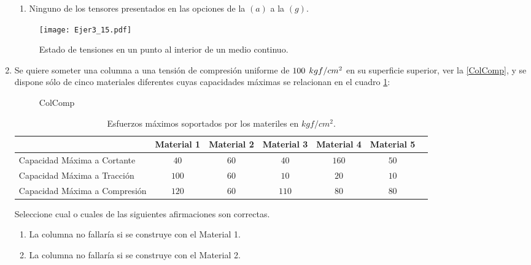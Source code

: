 \documentclass[../notas medios.tex]{subfiles}
\begin{document}
\begin{enumerate}
\begin{enumerate}
		\item Ninguno de los tensores presentados en las opciones de la $(a)$ a la $(g)$.
	\end{enumerate}
%
\begin{figure}[H]
	\centering
	\texttt{[image: Ejer3\_15.pdf]}
	\caption{Estado de tensiones en un punto al interior de un medio continuo.}
	\label{otro:esta}
\end{figure}
%
\item \label{punto16} Se quiere someter una columna a una tensi\'on de
compresi\'on uniforme de $100\hspace{.15cm} kgf/cm^2$ en su superficie superior, ver la  \cref{ColComp}, y se dispone s\'olo de cinco materiales diferentes cuyas capacidades m\'aximas se relacionan en el cuadro \cref{tab:materiales}:
%
\begin{figure}[H]
	\centering
		\hspace{2.0cm}
	\caption{ ColComp}
\end{figure}
%
\begin{table}[H]
\begin{center}
    \begin{tabular}{ | l | c | c | c | c | c | p{10cm} |}
    \hline
     & Material 1 & Material 2 & Material 3 & Material 4 & Material 5 \\ \hline
    Capacidad M\'axima a Cortante & $40$ & $60$ & $40$ & $160$ & $50$\\ \hline
    Capacidad M\'axima a Tracci\'on & $100$ & $60$ & $10$ & $20$ & $10$\\ \hline   
    Capacidad M\'axima a Compresi\'on & $120$ & $60$ & $110$ & $80$ & $80$\\ \hline     
   \end{tabular}
\end{center}
\caption {Esfuerzos m\'aximos soportados por los materiles en $kgf/cm^2$.} \label{tab:materiales} 
\end{table}
%
Seleccione cual o cuales de las siguientes afirmaciones son correctas.
%
\begin{enumerate}
	\item La columna no fallar\'ia si se construye con el Material 1.
	\item La columna no fallar\'ia si se construye con el Material 2.

\end{enumerate}
\end{enumerate}
\end{document}
